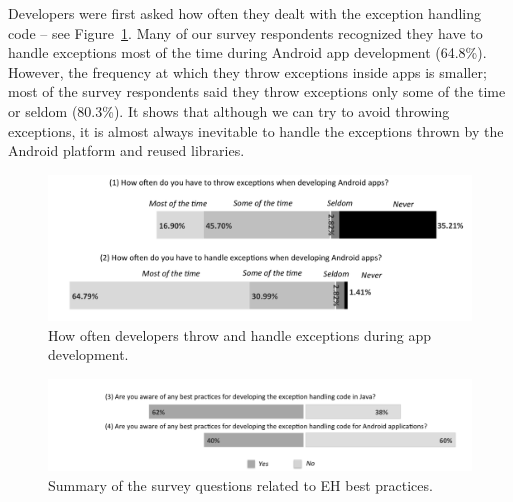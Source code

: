 {%

Developers were first asked how often they dealt with the exception handling code -- see Figure~\ref{fig:often}. Many of our survey respondents recognized they have to handle exceptions most of the time during Android app development (64.8\%). However, the frequency at which they throw exceptions inside apps is smaller; most of the survey respondents said they throw exceptions only some of the time or seldom (80.3\%). It shows that although we can try to avoid throwing exceptions, it is almost always inevitable to handle the exceptions thrown by the Android platform and reused libraries.

\begin{figure} \centering \includegraphics[scale=0.58]{agree_new4_point.png}
\caption{How often developers throw and handle exceptions during app development.}
\label{fig:often}
\end{figure}

\begin{figure} \centering \includegraphics[scale=0.60]{yes_no_best_new.png}
\caption{Summary of the survey questions related to EH best practices. }
\label{fig:allquest}
\end{figure}


}
